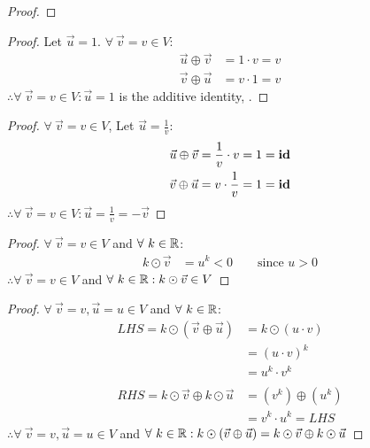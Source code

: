 \begin{enumerate}
\begin{proof}
  \end{proof}
  \begin{proof}
    Let $\vec{u} = 1$. $\forall~\vec{v} = v \in V$:
    \begin{align*}
      \vec{u} \oplus \vec{v} & = 1 \cdot v = v \\
      \vec{v} \oplus \vec{u} & = v \cdot 1 = v
    \end{align*}
    $\therefore \forall~\vec{v} = v \in V: \vec{u} = 1$ is the additive identity, .
  \end{proof}
  \begin{proof}
    $\forall~\vec{v} = v \in V$, Let $\vec{u} = \frac{1}{v}$:
    \begin{align*}
      \vec{u} \oplus \vec{v} & = \frac{1}{v} \cdot v = 1 = \text{\textbf{id}} \\
      \vec{v} \oplus \vec{u} & = v \cdot \frac{1}{v} = 1 = \text{\textbf{id}}
    \end{align*}
    $\therefore \forall~\vec{v} = v \in V: \vec{u} = \frac{1}{v} = -\vec{v}$
  \end{proof}
  \begin{proof}
    $\forall~\vec{v} = v \in V$ and $\forall~k \in \mathbb{R}$:
    \begin{align*}
      k \odot \vec{v} & = u^k < 0 \qquad \text{since $u>0$}
    \end{align*}
    $\therefore \forall~\vec{v} = v \in V$ and $\forall~k \in \mathbb{R}: k \odot \vec{v} \in V$
  \end{proof}
  \begin{proof}
    $\forall~\vec{v} = v,\vec{u} = u \in V$ and $\forall~k \in \mathbb{R}$:
    \begin{align*}
      LHS = k \odot (\vec{v} \oplus \vec{u})       & = k \odot (u \cdot v) \\
                                                   & = (u \cdot v)^k       \\
                                                   & = u^k \cdot v^k       \\ \\
      RHS = k \odot \vec{v} \oplus k \odot \vec{u} & = (v^k) \oplus (u^k)  \\
                                                   & = v^k \cdot u^k = LHS
    \end{align*}
    $\therefore \forall~\vec{v} = v,\vec{u} = u \in V$ and $\forall~k \in \mathbb{R}: k \odot (\vec{v} \oplus \vec{u}) = k \odot \vec{v} \oplus k \odot \vec{u}$

\end{proof}
\end{enumerate}

